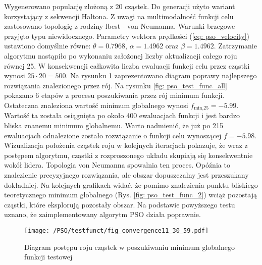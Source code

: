 Wygenerowano populację złożoną z 20 cząstek. Do generacji użyto wariant korzystający z sekwencji Haltona. Z uwagi na multimodalność funkcji celu zastosowano topologię z rodziny lbest - von Neumanna. Warunki brzegowe przyjęto typu niewidocznego. Parametry wektora prędkości (\ref{eq: pso_velocity}) ustawiono domyślnie równe: $\theta=0.7968$, $\alpha=1.4962$ oraz $\beta=1.4962$. Zatrzymanie algorytmu nastąpiło po wykonaniu założonej liczby aktualizacji całego roju równej 25. W konsekwencji całkowita liczba ewaluacji funkcji celu przez cząstki wynosi $25\cdot20=500$. Na rysunku \ref{fig: pso_convergence_plot} zaprezentowano diagram poprawy najlepszego rozwiązania znalezionego przez rój. Na rysunku \ref{fig: pso_test_func_all} pokazano 6 etapów z procesu poszukiwania przez rój minimum funkcji. Ostateczna znaleziona wartość minimum globalnego wynosi $f_{\text{min,25}}=-5.99$. Wartość ta została osiągnięta po około 400 ewaluacjach funkcji i jest bardzo bliska znanemu minimum globalnemu. Warto nadmienić, że już po 215 ewaluacjach odnalezione zostało rozwiązanie o funkcji celu wynoszącej $f=-5.98$. Wizualizacja położenia cząstek roju w kolejnych iteracjach pokazuje, że wraz z postępem algorytmu, cząstki z rozproszonego układu skupiają się konsekwentnie wokół lidera. Topologia von Neumanna spowalnia ten proces. Opóźnia to znalezienie precyzyjnego rozwiązania, ale obszar dopuszczalny jest przeszukany dokładniej. Na kolejnych grafikach widać, że pomimo znalezienia punktu bliskiego teoretycznego minimum globalnego (Rys. \ref{fig: pso_test_func_2}) wciąż pozostają cząstki, które eksplorują pozostały obszar. Na podstawie powyższego testu uznano, że zaimplementowany algorytm PSO działa poprawnie.
\begin{figure}[hbt!]
	\centering
	\texttt{[image: /PSO/testfunct/fig\_convergence11\_30\_59.pdf]} 
	\captionsetup{justification=centering}
	\caption{Diagram postępu roju cząstek w poszukiwaniu minimum globalnego funkcji testowej}
	\label{fig: pso_convergence_plot} 
\end{figure}

